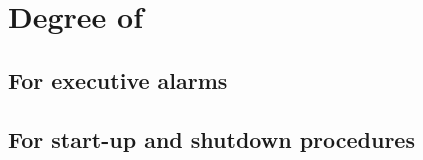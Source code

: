 \section{Degree of }
\label{app:samplecal}
\subsection{For executive alarms}

\subsection{For start-up and shutdown procedures}

